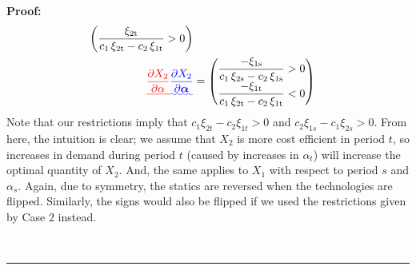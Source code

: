 \documentclass[11pt,a4paper,leqno]{extarticle}
\newenvironment{proof}[1][Proof]{\noindent\textbf{#1:} }{\ \rule{0.5em}{0.5em}}
\providecommand{\DIFadd}[1]{{\protect\color{blue}\uwave{#1}}} %
\providecommand{\DIFdel}[1]{{\protect\color{red}\sout{#1}}}                      %
\providecommand{\DIFaddbegin}{} %
\providecommand{\DIFaddend}{} %
\providecommand{\DIFdelbegin}{} %
\providecommand{\DIFdelend}{} %
\begin{document}
\begin{proof}
\begin{align*}
\begin{pmatrix}
	\dfrac{\xi _{\mathrm{2t}}}{c_{1}\,\xi _{\mathrm{2t}}-c_{2}\,\xi _{\mathrm{1t}}}>0
	\end{pmatrix}\\
	\DIFdelbegin \DIFdel{\frac{\partial X_2}{\partial \alpha} }\DIFdelend \DIFaddbegin \DIFadd{\frac{\partial X_2}{\partial \boldsymbol{\alpha}} }\DIFaddend &= 
	\begin{pmatrix}
	\dfrac{-\xi _{\mathrm{1s}}}{c_{1}\,\xi _{\mathrm{2s}}-c_{2}\,\xi _{\mathrm{1s}}}>0 \\
	\dfrac{-\xi _{\mathrm{1t}}}{c_{1}\,\xi _{\mathrm{2t}}-c_{2}\,\xi _{\mathrm{1t}}}<0
	\end{pmatrix}
	\end{align*}
	Note that our restrictions imply that $c_1 \xi_{2t} - c_2 \xi_{1t} > 0$ and $c_2 \xi_{1s} - c_1 \xi_{2s} > 0$. From here, the intuition is clear; we assume that $X_2$ is more cost efficient in period $t$, so increases in demand during period $t$ (caused by increases in $\alpha_t$) will increase the optimal quantity of $X_2$. And, the same applies to $X_1$ with respect to period $s$ and $\alpha_s$. Again, due to symmetry, the statics are reversed when the technologies are flipped. Similarly, the signs would also be flipped if we used the restrictions given by Case 2 instead. 
	

\end{proof}
\end{document}
